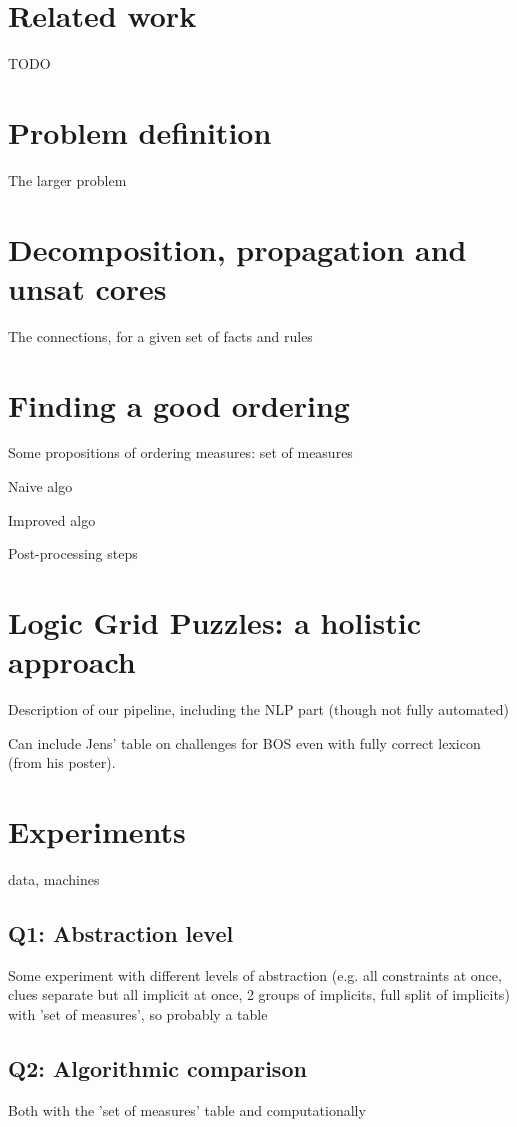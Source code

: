 \documentclass{ecai}
\begin{document}
\section{Related work}
TODO

\section{Problem definition}
The larger problem

\section{Decomposition, propagation and unsat cores}
The connections, for a given set of facts and rules

\section{Finding a good ordering}
Some propositions of ordering measures: set of measures

Naive algo

Improved algo

Post-processing steps

\section{Logic Grid Puzzles: a holistic approach}
Description of our pipeline, including the NLP part (though not fully automated)

Can include Jens' table on challenges for BOS even with fully correct lexicon (from his poster).

\section{Experiments}

data, machines

\subsection{Q1: Abstraction level}
Some experiment with different levels of abstraction (e.g. all constraints at once, clues separate but all implicit at once, 2 groups of implicits, full split of implicits)
with 'set of measures', so probably a table

\subsection{Q2: Algorithmic comparison}
Both with the 'set of measures' table and computationally
\end{document}
